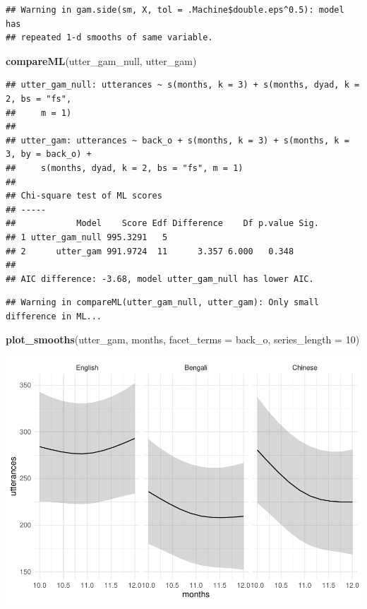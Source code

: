 \documentclass[]{article}
\newenvironment{Shaded}{\begin{snugshade}}{\end{snugshade}}
\newcommand{\DataTypeTok}[1]{\textcolor[rgb]{0.13,0.29,0.53}{#1}}
\newcommand{\DecValTok}[1]{\textcolor[rgb]{0.00,0.00,0.81}{#1}}
\newcommand{\KeywordTok}[1]{\textcolor[rgb]{0.13,0.29,0.53}{\textbf{#1}}}
\newcommand{\NormalTok}[1]{#1}
\begin{document}
\begin{verbatim}
## Warning in gam.side(sm, X, tol = .Machine$double.eps^0.5): model has
## repeated 1-d smooths of same variable.
\end{verbatim}

\begin{Shaded}
\begin{Highlighting}[]
\KeywordTok{compareML}\NormalTok{(utter_gam_null, utter_gam)}
\end{Highlighting}
\end{Shaded}

\begin{verbatim}
## utter_gam_null: utterances ~ s(months, k = 3) + s(months, dyad, k = 2, bs = "fs", 
##     m = 1)
## 
## utter_gam: utterances ~ back_o + s(months, k = 3) + s(months, k = 3, by = back_o) + 
##     s(months, dyad, k = 2, bs = "fs", m = 1)
## 
## Chi-square test of ML scores
## -----
##            Model    Score Edf Difference    Df p.value Sig.
## 1 utter_gam_null 995.3291   5                              
## 2      utter_gam 991.9724  11      3.357 6.000   0.348     
## 
## AIC difference: -3.68, model utter_gam_null has lower AIC.
\end{verbatim}

\begin{verbatim}
## Warning in compareML(utter_gam_null, utter_gam): Only small difference in ML...
\end{verbatim}

\begin{Shaded}
\begin{Highlighting}[]
\KeywordTok{plot_smooths}\NormalTok{(utter_gam, months, }\DataTypeTok{facet_terms =}\NormalTok{ back_o, }\DataTypeTok{series_length =} \DecValTok{10}\NormalTok{)}
\end{Highlighting}
\end{Shaded}

\includegraphics{supplement_files/figure-latex/utter-gam-plot-1.pdf}
\end{document}

